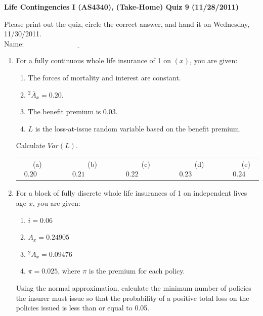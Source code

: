 \documentclass[11pt,fleqn,oneside]{book}
\begin{document}
\newpage
\thispagestyle{empty}
\setcounter{page}{1}
\begin{center}
{ \large \bf Life Contingencies I (AS4340), (Take-Home) Quiz 9 (11/28/2011)}
\end{center}
\noindent
Please print out the quiz, circle the correct answer, and hand it on Wednesday, 11/30/2011.\\
Name: $\underline{\;\;\;\;\;\;\;\;\;\;\;\;\;\;\;\;\;\;\;\;\;\;\;\;\;\;\;\;\;\;\;\;\;\;\;\;\;\;\;\;\;\;\;\;\;\;\;\;\;\;\;\;\;}$
\begin{enumerate}

\item For a fully continuous whole life insurance of 1 on $(x)$, you are given: 
\begin{enumerate}
\item  The forces of mortality and interest are constant.
\item $^2\bar{A}_x= 0.20$.
\item The benefit premium is 0.03.
\item $L$ is the loss-at-issue random variable based on the benefit premium. 
\end{enumerate}
Calculate $Var(L)$.%


\begin{center}
\small
\begin{tabular}{c c c c c}
(a) $0.20\;\;\;\;\;\;\;$ & 
$\;\;\;\;\;\;\;$(b) $0.21\;\;\;\;\;\;\;$ &
$\;\;\;\;\;\;\;$(c) $0.22\;\;\;\;\;\;\;$ & 
$\;\;\;\;\;\;\;$(d) $0.23\;\;\;\;\;\;\;$ &
$\;\;\;\;\;\;\;$(e) $0.24$
\end{tabular}
\end{center}
\normalsize

\item For a block of fully discrete whole life insurances of 1 on independent lives age $x$, you are given:
\begin{enumerate}
\item $i = 0.06$
\item $A_x = 0.24905$
\item $^2A_x = 0.09476$
\item $\pi = 0.025$, where $\pi$ is the premium for each policy. 
\end{enumerate}
Using the normal approximation, calculate the minimum number of policies the insurer must issue so that the probability of a positive total loss on the policies issued is less than or equal to 0.05.%


\end{enumerate}
\end{document}
